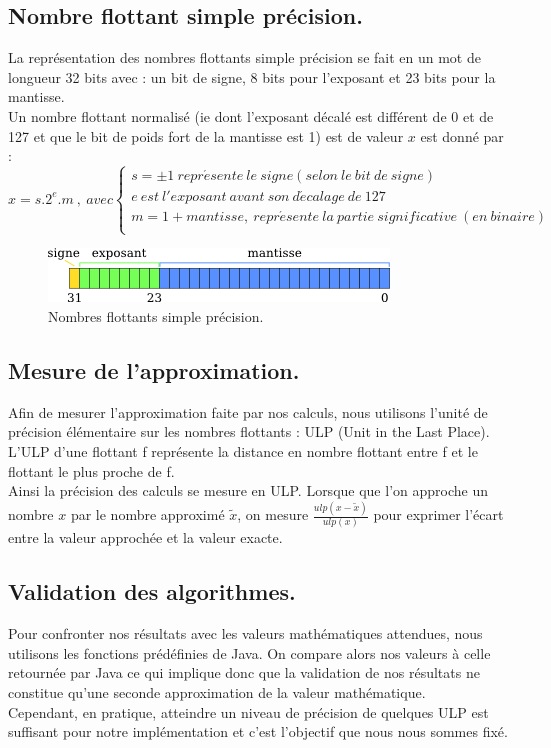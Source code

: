 \documentclass[a4,12pt]{article}
\begin{document}
\subsection{Nombre flottant simple précision.}
La représentation des nombres flottants simple précision se fait en un mot de longueur 32 bits avec : un bit de signe, 8 bits pour l'exposant et 23 bits pour la mantisse.\\
Un nombre flottant normalisé (ie dont l'exposant décalé est différent de 0 et de 127 et que le bit de poids fort de la mantisse est 1) est de valeur $x$ est donné par : \\
$$ x = s.2^{e}.m\ ,\ avec
 \left \{
	\begin{array}{l}
	s = \pm 1\ repr\acute esente\ le\ signe (selon\ le\ bit\ de\ signe)\\
	e\ est\ l'exposant\ avant\ son\ d\acute ecalage\ de\ 127\\
	m = 1 + mantisse,\ repr\acute esente\ la\ partie\ significative\ (en\ binaire)\\
	\end{array}
\right.
$$
\begin{figure}[b]
    \centering
    \includegraphics{float.png}
    \caption{Nombres flottants simple précision.}
    \label{Représentation des nombres flottants simple précision.}
\end{figure}

\subsection{Mesure de l'approximation.}
Afin de mesurer l'approximation faite par nos calculs, nous utilisons l'unité de précision élémentaire sur les nombres flottants : ULP (Unit in the Last Place). L'ULP d'une flottant f représente la distance en nombre flottant entre f et le flottant le plus proche de f.\\
Ainsi la précision des calculs se mesure en ULP. Lorsque que l'on approche un nombre $x$ par le nombre approximé $\tilde x$, on mesure $ \frac{ulp(x - \tilde x)}{ulp(x)} $ pour exprimer l'écart entre la valeur approchée et la valeur exacte.

\subsection{Validation des algorithmes.}
Pour confronter nos résultats avec les valeurs mathématiques attendues, nous utilisons les fonctions prédéfinies de Java. On compare alors nos valeurs à celle retournée par Java ce qui implique donc que la validation de nos résultats ne constitue qu'une seconde approximation de la valeur mathématique.\\
Cependant, en pratique, atteindre un niveau de précision de quelques ULP est suffisant pour notre implémentation et c'est l'objectif que nous nous sommes fixé.
\end{document}
